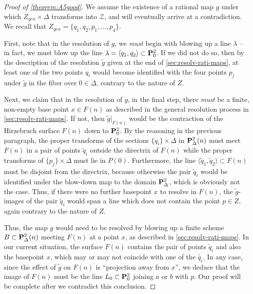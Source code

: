\documentclass[12pt,reqno]{amsart}
\numberwithin{equation}{section}
\newcommand{\td}{\widetilde}
\begin{document}
\begin{proof}[Proof of \autoref{theorem:A5good}]
  We assume the existence of a rational map $g$ under which
  $Z_{gen} \times \Delta$ transforms into $\mathcal{Z}$, and will
  eventually arrive at a contradiction.  We recall that
  $Z_{gen} = \{q_1, q_2, p_1, \dots, p_4\}$.

  First, note that in the resolution of $g$, we {\sl must} begin with
  blowing up a line $\lambda$ -- in fact, we must blow up the line
  $\lambda = \langle q_{1}, q_{2} \rangle \subset \P^{2}_{0}$.  If we
  did not do so, then by the description of the resolution $\td{g}$
  given at the end of \autoref{sec:resolv-rati-maps}, at least one of
  the two points $q_{i}$ would become identified with the four points
  $p_{j}$ under $\td{g}$ in the fiber over $0 \in \Delta$, contrary to
  the nature of $Z$.

  Next, we claim that in the resolution of $g$, in the final step,
  there {\sl must} be a finite, non-empty base point $x \in F(n)$ as
  described in the general resolution process in
  \autoref{sec:resolv-rati-maps}.  If not, then $\td{g}\big|_{F(n)}$
  would be the contraction of the Hirzebruch surface $F(n)$ down to
  $\P^{2}_{0}$.  By the reasoning in the previous paragraph, the
  proper transforms of the sections $\{q_{i}\} \times \Delta$ in
  $\P^{2}_{\Delta}(n)$ must meet $F(n)$ in a pair of points
  $\td{q}_{i}$ outside the directrix of $F(n)$ while the proper
  transforms of $\{p_{j}\} \times \Delta$ must lie in
  $P(0)$. Furthermore, the line
  $\langle \td{q}_{1}, \td{q}_{2} \rangle \subset F(n)$ must be
  disjoint from the directrix, because otherwise the pair $\td{q}_{i}$
  would be identified under the blow-down map to the domain
  $\P^{2}_{\Delta}$, which is obviously not the case.  Thus, if there
  were no further basepoint $x$ to resolve in $F(n)$, the
  $\td{g}$-images of the pair $\td{q}_{i}$ would span a line which
  does not contain the point $p \in Z$, again contrary to the nature
  of $Z$.

  Thus, the map $g$ would need to be resolved by blowing up a finite
  scheme $B \subset \P^{2}_{\Delta}(n)$ meeting $F(n)$ at a point $x$,
  as described in \autoref{sec:resolv-rati-maps}. In our current
  situation, the surface $F(n)$ contains the pair of points
  $\td{q}_{i}$ and also the basepoint $x$, which may or may not
  coincide with one of the $\td{q_{i}}$.  In any case, since the
  effect of $\td{g}$ on $F(n)$ is ``projection away from $x$'', we
  deduce that the image of $F(n)$ must be the line
  $L_0 \subset \P^{2}_{0}$ joining $a$ or $b$ with $p$.  Our proof
  will be complete after we contradict this conclusion.


\end{proof}
\end{document}
